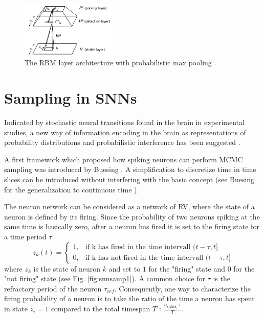 \begin{figure}[h!]
	\centering
    	\includegraphics[width=0.4\textwidth]{imgs/prob_max_pool.png} 
    \caption{The RBM layer architecture with probabilistic max pooling \cite{lee2009convolutional}.}
	\label{fig:probmaxpool}
\end{figure}


\section{Sampling in SNNs} \label{c:snnsampling}

Indicated by stochastic neural transitions found in the brain in experimental studies, a new way of information encoding in the brain as representations of probability distributions and probabilistic interference has been suggested \cite{lee2003hierarchical}\cite{yang2007probabilistic}\cite{griffiths2008bayesian}.


A first framework which proposed how spiking neurons can perform MCMC sampling was introduced by Buesing \cite{Buesing2011}.
A simplification to discretize time in time slices can be introduced without interfering with the basic concept (see Buesing for the generalization to continuous time \cite{Buesing2011}).

The neuron network can be considered as a network of RV, where the state of a neuron is defined by its firing. 
Since the probability of two neurons spiking at the same time is basically zero, after a neuron has fired it is set to the firing state for a time period $\tau$
\[
z_k(t) = 
\begin{cases}
1, &  \text{if k has fired in the time intervall } (t - \tau , t ] \\
0, &  \text{if k has not fired in the time intervall } (t - \tau , t ] 
\end{cases}
\] 
where $z_k$ is the state of neuron $k$ and set to $1$ for the "firing" state and $0$ for the "not firing" state (see Fig. \ref{fig:snnsamp1}). 
A common choice for $\tau$ is the refractory period of the neuron $\tau_{ref}$.
Consequently, one way to characterize the firing probability of a neuron is to take the ratio of the time a neuron has spent in state $z_i=1$ compared to the total timespan $T$ : $\frac{n_{\text{spikes}_i} \, \tau}{ T }$.

